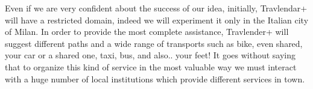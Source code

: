 Even if we are very confident about the success of our idea, initially, Travlendar+ will have a restricted domain, indeed we will experiment it only in the Italian city of Milan. 
In order to provide the most complete assistance, Travlender+ will suggest different paths and a wide range of transports such as bike, even shared, your car or a shared one, taxi, bus, and also.. your feet!
It goes without saying that to organize this kind of service in the most valuable way we must interact with a huge number of local institutions which provide different services in town. 
